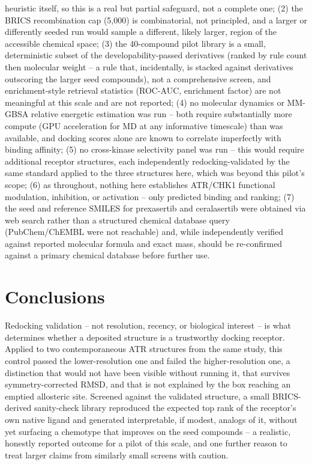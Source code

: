 \documentclass[11pt]{article}
\begin{document}
heuristic itself, so this is a real but partial safeguard, not a
complete one; (2) the BRICS recombination
cap (5,000) is combinatorial, not principled, and a larger or differently
seeded run would sample a different, likely larger, region of the
accessible chemical space; (3) the 40-compound pilot library is a small,
deterministic subset of the developability-passed derivatives (ranked by
rule count then molecular weight -- a rule that, incidentally, is stacked
against derivatives outscoring the larger seed compounds), not a
comprehensive screen, and enrichment-style retrieval statistics (ROC-AUC,
enrichment factor) are not meaningful at this scale and are not reported;
(4) no molecular dynamics or MM-GBSA relative energetic estimation was run
-- both require substantially more compute (GPU acceleration for MD at any
informative timescale) than was available, and docking scores alone are
known to correlate imperfectly with binding affinity; (5) no cross-kinase
selectivity panel was run -- this would require additional receptor
structures, each independently redocking-validated by the same standard
applied to the three structures here, which was beyond this pilot's scope;
(6) as throughout, nothing here establishes ATR/CHK1 functional modulation,
inhibition, or activation -- only predicted binding and ranking; (7) the
seed and reference SMILES for prexasertib and ceralasertib were obtained
via web search rather than a structured chemical database query
(PubChem/ChEMBL were not reachable) and, while independently verified
against reported molecular formula and exact mass, should be re-confirmed
against a primary chemical database before further use.

\section*{Conclusions}

Redocking validation -- not resolution, recency, or biological interest --
is what determines whether a deposited structure is a trustworthy docking
receptor. Applied to two contemporaneous ATR structures from the same
study, this control passed the lower-resolution one and failed the
higher-resolution one, a distinction that would not have been visible
without running it, that survives symmetry-corrected RMSD, and that is not
explained by the box reaching an emptied allosteric site. Screened against
the validated structure, a small BRICS-derived sanity-check library
reproduced the expected top rank of the receptor's own native ligand and
generated interpretable, if modest, analogs of it, without yet surfacing a
chemotype that improves on the seed compounds -- a realistic, honestly
reported outcome for a pilot of this scale, and one further reason to treat
larger claims from similarly small screens with caution.
\end{document}
